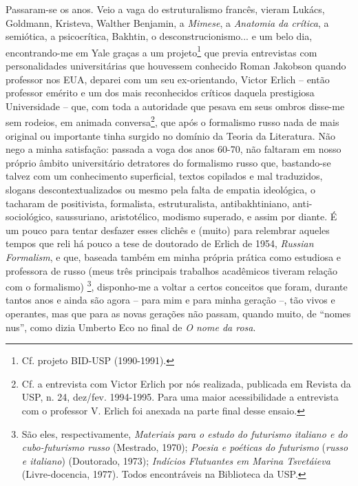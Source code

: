 Passaram-se os anos. Veio a vaga do estruturalismo francês, vieram
Lukács, Goldmann, Kristeva, Walther Benjamin, a \emph{Mimese}, a
\emph{Anatomia da crítica}, a semiótica, a psicocrítica, Bakhtin, o
desconstrucionismo... e um belo dia, encontrando-me em Yale graças a um
projeto\footnote{Cf. projeto BID-USP (1990-1991).} que previa
entrevistas com personalidades universitárias que houvessem conhecido
Roman Jakobson quando professor nos EUA, deparei com um seu
ex-orientando, Victor Erlich -- então professor emérito e um dos mais
reconhecidos críticos daquela prestigiosa Universidade -- que, com toda
a autoridade que pesava em seus ombros disse-me sem rodeios, em animada
conversa\footnote{Cf. a entrevista com Victor Erlich por nós realizada,
  publicada em Revista da USP, n. 24, dez/fev. 1994-1995. Para uma maior
  acessibilidade a entrevista com o professor V. Erlich foi anexada na
  parte final desse ensaio.}, que após o formalismo russo nada de mais
original ou importante tinha surgido no domínio da Teoria da Literatura.
Não nego a minha satisfação: passada a voga dos anos 60-70, não faltaram
em nosso próprio âmbito universitário detratores do formalismo russo
que, bastando-se talvez com um conhecimento superficial, textos
copilados e mal traduzidos, slogans descontextualizados ou mesmo pela
falta de empatia ideológica, o tacharam de positivista, formalista,
estruturalista, antibakhtiniano, anti-sociológico, saussuriano,
aristotélico, modismo superado, e assim por diante. É um pouco para
tentar desfazer esses clichês e (muito) para relembrar aqueles tempos
que reli há pouco a tese de doutorado de Erlich de 1954, \emph{Russian
Formalism}, e que, baseada também em minha própria prática como
estudiosa e professora de russo (meus três principais trabalhos
acadêmicos tiveram relação com o formalismo) \footnote{São eles,
  respectivamente, \emph{Materiais para o estudo do futurismo italiano e
  do cubo-futurismo russo} (Mestrado, 1970); \emph{Poesia e poéticas do
  futurismo} (\emph{russo e italiano}) (Doutorado, 1973); \emph{Indícios
  Flutuantes em Marina Tsvetáieva} (Livre-docencia, 1977). Todos
  encontráveis na Biblioteca da USP.}, disponho-me a voltar a certos
conceitos que foram, durante tantos anos e ainda são agora -- para mim e
para minha geração --, tão vivos e operantes, mas que para as novas
gerações não passam, quando muito, de ``nomes nus'', como dizia Umberto
Eco no final de \emph{O nome da rosa}.

